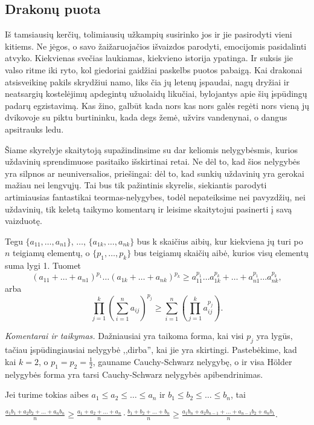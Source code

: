 \newpage
\subsection{Drakonų puota}

Iš tamsiausių kerčių, tolimiausių užkampių susirinko jos ir jie pasirodyti
vieni kitiems. Ne jėgos, o savo žaižaruojačios išvaizdos parodyti, emocijomis
pasidalinti atvyko. Kiekvienas svečias laukiamas, kiekvieno istorija ypatinga.
Ir suksis jie valso ritme iki ryto, kol giedoriai gaidžiai paskelbs puotos
pabaigą. Kai drakonai atsisveikinę pakils skrydžiui namo, liks čia jų letenų
įspaudai, nagų dryžiai ir neatsargių kostelėjimų apdegintų užuolaidų likučiai,
bylojantys apie šių įspūdingų padarų egzistavimą. Kas žino, galbūt kada nors
kas nors galės regėti nors vieną jų dvikovoje su piktu burtininku, kada degs
žemė, užvirs vandenynai, o dangus apsitrauks ledu.

Šiame skyrelyje skaitytoją supažindinsime su dar keliomis nelygybėsmis, kurios
uždavinių sprendimuose pasitaiko išskirtinai retai. Ne dėl to, kad šios
nelygybės yra silpnos ar neuniversalios, priešingai: dėl to, kad sunkių
uždavinių yra gerokai mažiau nei lengvųjų. Tai bus tik pažintinis skyrelis,
siekiantis parodyti artimiausias fantastikai teormas-nelygybes, todėl
nepateiksime nei pavyzdžių, nei uždavinių, tik keletą taikymo komentarų ir
leisime skaitytojui pasinerti į savą vaizduotę.

\begin{thm}[H\"{o}lder]
  Tegu $\{a_{11},\ldots,a_{n1}\}$, $\ldots$, $\{a_{1k},\ldots,a_{nk}\}$ bus k
  skaičius aibių, kur kiekviena jų turi po $n$ teigiamų elementų, o
  $\{p_1,\ldots,p_k\}$ bus teigiamų skaičių aibė, kurios visų elementų suma
  lygi 1. Tuomet
  $$(a_{11}+\ldots+a_{n1})^{p_1}\ldots(a_{1k}+\ldots+a_{nk})^{p_k}\geq
  a_{11}^{p_1}\ldots a_{1k}^{p_k}+\ldots+a_{n1}^{p_1}\ldots a_{nk}^{p_k},$$
  arba
  $$\prod_{j=1}^{k}{\left(\sum_{i=1}^{n}{a_{ij}}\right)^{p_j}}\geq\sum_{i=1}^{n}{\left(\prod_{j=1}^{k}{a_{ij}^{p_j}}\right)}.$$
\end{thm}

\noindent \textit{Komentarai ir taikymas.} Dažniausiai yra taikoma forma,
kai visi $p_j$ yra lygūs, tačiau įspūdingiausiai nelygybė ,,dirba'', kai
jie yra skirtingi. Pastebėkime, kad kai $k=2$, o $p_1=p_2=\frac{1}{2}$,
gauname Cauchy-Schwarz nelygybę, o ir visa H\"{o}lder nelygybės forma yra
tarsi Cauchy-Schwarz nelygybės apibendrinimas.

\begin{thm}[Chebyshev] Jei turime tokias aibes $a_1\leq a_2\leq\ldots\leq
  a_n$ ir $b_1\leq b_2\leq\ldots\leq b_n$, tai \begin{center}
    $\frac{a_1b_1+a_2b_2+\ldots+a_nb_n}{n}\geq\frac{a_1+a_2+\ldots+a_n}{n}\cdot\frac{b_1+b_2+\ldots+b_n}{n}\geq\frac{a_1b_n+a_2b_{n-1}+\ldots+a_{n-1}b_2+a_nb_1}{n}.$
  \end{center}
\end{thm}

